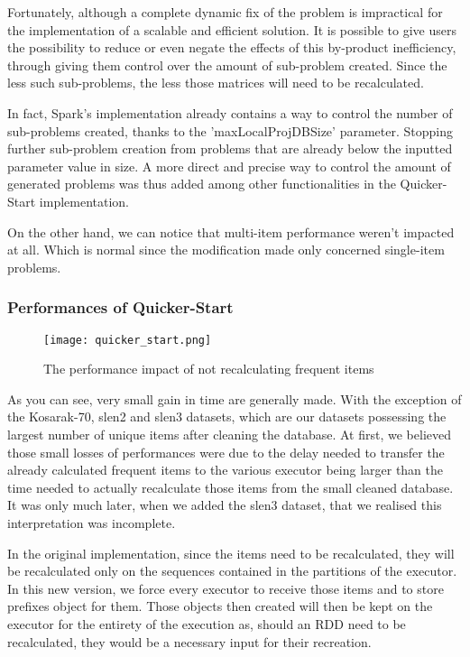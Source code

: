 \documentclass{eplmastersthesis}
\begin{document}
\begin{enumerate}
Fortunately, although a complete dynamic fix of the problem is impractical for the implementation of a scalable and efficient solution. It is possible to give users the possibility to reduce or even negate the effects of this by-product inefficiency, through giving them control over the amount of sub-problem created. Since the less such sub-problems, the less those matrices will need to be recalculated. \newline

In fact, Spark's implementation already contains a way to control the number of sub-problems created, thanks to the 'maxLocalProjDBSize' parameter. Stopping further sub-problem creation from problems that are already below the inputted parameter value in size. A more direct and precise way to control the amount of generated problems was thus added among other functionalities in the Quicker-Start implementation.

\end{enumerate}

On the other hand, we can notice that multi-item performance weren't impacted at all. Which is normal since the modification made only concerned single-item problems. \newline

\subsubsection{Performances of Quicker-Start}

\begin{figure}[h]
  \centering
  \texttt{[image: quicker\_start.png]}
  \caption{The performance impact of not recalculating frequent items}
  \label{fig:new_functionalities_perf}
\end{figure}

As you can see, very small gain in time are generally made. With the exception of the Kosarak-70, slen2 and slen3 datasets, which are our datasets possessing the largest number of unique items after cleaning the database. At first, we believed those small losses of performances were due to the delay needed to transfer the already calculated frequent items to the various executor being larger than the time needed to actually recalculate those items from the small cleaned database. It was only much later, when we added the slen3 dataset, that we realised this interpretation was incomplete.\newline

In the original implementation, since the items need to be recalculated, they will be recalculated only on the sequences contained in the partitions of the executor. In this new version, we force every executor to receive those items and to store prefixes object for them. Those objects then created will then be kept on the executor for the entirety of the execution as, should an RDD need to be recalculated, they would be a necessary input for their recreation. \newline
\end{document}
